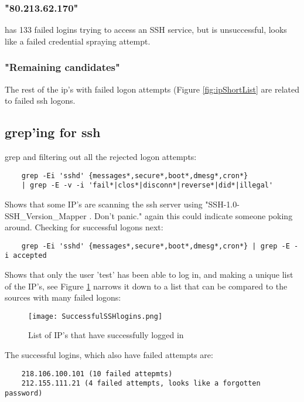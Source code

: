 \documentclass[
	letterpaper, %
	10pt, %
	unnumberedsections, %
	twoside, %
]{APAAssignment}
\begin{document}
\subsubsection{"80.213.62.170"}
has 133 failed logins trying to access an SSH service, but is unsuccessful, looks like a failed credential spraying attempt.

\subsubsection{"Remaining candidates"}
The rest of the ip's with failed logon attempts (Figure \ref{fig:ipShortList} are related to failed ssh logons.


\subsection{grep'ing for ssh}
grep and filtering out all the rejected logon attempts:

\begin{verbatim}
	grep -Ei 'sshd' {messages*,secure*,boot*,dmesg*,cron*}
	| grep -E -v -i 'fail*|clos*|disconn*|reverse*|did*|illegal'
\end{verbatim}
Shows that some IP's are scanning the ssh server using "SSH-1.0-SSH\_Version\_Mapper .  Don't panic." again this could indicate someone poking  around. Checking for successful logons next:

\begin{verbatim}
	grep -Ei 'sshd' {messages*,secure*,boot*,dmesg*,cron*} | grep -E -i accepted
\end{verbatim}

Shows that only the user 'test' has been able to log in, and making a unique list of the IP's, see Figure \ref{fig:successfulSSH} narrows it down to a list that can be compared to the sources with many failed logons:


\begin{figure}[!htp] %
	\centering
	\texttt{[image: SuccessfulSSHlogins.png]}
	\caption{List of IP's that have successfully logged in}
	\label{fig:successfulSSH}
\end{figure}

The successful logins, which also have failed attempts are:
\begin{verbatim}
	218.106.100.101 (10 failed attepmts)
	212.155.111.21 (4 failed attempts, looks like a forgotten password)
\end{verbatim}
\end{document}
